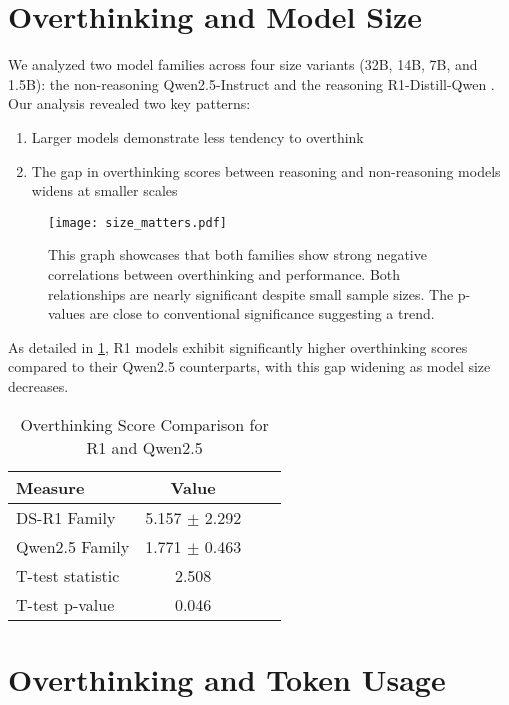 \section{Overthinking and Model Size}
\label{sec:model_size}

We analyzed two model families across four size variants (32B, 14B, 7B, and 1.5B): the non-reasoning Qwen2.5-Instruct \cite{qwen2,qwen2.5} and the reasoning R1-Distill-Qwen \cite{deepseekai2025deepseekr1incentivizingreasoningcapability}. Our analysis revealed two key patterns:

\begin{enumerate}
    \item Larger models demonstrate less tendency to overthink
    \item The gap in overthinking scores between reasoning and non-reasoning models widens at smaller scales
\end{enumerate}

\begin{figure}[t]
    \centering
    \texttt{[image: size\_matters.pdf]}
    \caption{This graph showcases that both families show strong negative correlations between overthinking and performance. Both relationships are nearly significant despite small sample sizes. The p-values are close to conventional significance suggesting a trend.}
    \label{fig:figure5}
\end{figure}

As detailed in \cref{tab:overthinking_comparison}, R1 models exhibit significantly higher overthinking scores compared to their Qwen2.5 counterparts, with this gap widening as model size decreases.

\begin{table}[ht]
\centering
\begin{tabular}{lccc}
\bottomrule
\textbf{Measure} & \textbf{Value} \\
\midrule
DS-R1 Family        & 5.157 $\pm$ 2.292 \\
Qwen2.5 Family      & 1.771 $\pm$ 0.463 \\
\midrule
T-test statistic     & 2.508 \\
T-test p-value       & 0.046 \\
\bottomrule
\end{tabular}
\caption{Overthinking Score Comparison for R1 and Qwen2.5}
\label{tab:overthinking_comparison}
\end{table}

\section{Overthinking and Token Usage}
\label{sec:token_usage}

